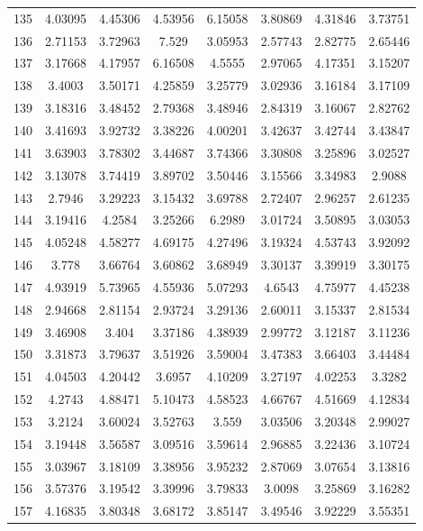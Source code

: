 \begin{center}
\begin{longtable}{cccccccc}
135 & 4.03095 & 4.45306 & 4.53956 & 6.15058 & 3.80869 & 4.31846 & 3.73751\\
136 & 2.71153 & 3.72963 & 7.529 & 3.05953 & 2.57743 & 2.82775 & 2.65446\\
137 & 3.17668 & 4.17957 & 6.16508 & 4.5555 & 2.97065 & 4.17351 & 3.15207\\
138 & 3.4003 & 3.50171 & 4.25859 & 3.25779 & 3.02936 & 3.16184 & 3.17109\\
139 & 3.18316 & 3.48452 & 2.79368 & 3.48946 & 2.84319 & 3.16067 & 2.82762\\
140 & 3.41693 & 3.92732 & 3.38226 & 4.00201 & 3.42637 & 3.42744 & 3.43847\\
141 & 3.63903 & 3.78302 & 3.44687 & 3.74366 & 3.30808 & 3.25896 & 3.02527\\
142 & 3.13078 & 3.74419 & 3.89702 & 3.50446 & 3.15566 & 3.34983 & 2.9088\\
143 & 2.7946 & 3.29223 & 3.15432 & 3.69788 & 2.72407 & 2.96257 & 2.61235\\
144 & 3.19416 & 4.2584 & 3.25266 & 6.2989 & 3.01724 & 3.50895 & 3.03053\\
145 & 4.05248 & 4.58277 & 4.69175 & 4.27496 & 3.19324 & 4.53743 & 3.92092\\
146 & 3.778 & 3.66764 & 3.60862 & 3.68949 & 3.30137 & 3.39919 & 3.30175\\
147 & 4.93919 & 5.73965 & 4.55936 & 5.07293 & 4.6543 & 4.75977 & 4.45238\\
148 & 2.94668 & 2.81154 & 2.93724 & 3.29136 & 2.60011 & 3.15337 & 2.81534\\
149 & 3.46908 & 3.404 & 3.37186 & 4.38939 & 2.99772 & 3.12187 & 3.11236\\
150 & 3.31873 & 3.79637 & 3.51926 & 3.59004 & 3.47383 & 3.66403 & 3.44484\\
151 & 4.04503 & 4.20442 & 3.6957 & 4.10209 & 3.27197 & 4.02253 & 3.3282\\
152 & 4.2743 & 4.88471 & 5.10473 & 4.58523 & 4.66767 & 4.51669 & 4.12834\\
153 & 3.2124 & 3.60024 & 3.52763 & 3.559 & 3.03506 & 3.20348 & 2.99027\\
154 & 3.19448 & 3.56587 & 3.09516 & 3.59614 & 2.96885 & 3.22436 & 3.10724\\
155 & 3.03967 & 3.18109 & 3.38956 & 3.95232 & 2.87069 & 3.07654 & 3.13816\\
156 & 3.57376 & 3.19542 & 3.39996 & 3.79833 & 3.0098 & 3.25869 & 3.16282\\
157 & 4.16835 & 3.80348 & 3.68172 & 3.85147 & 3.49546 & 3.92229 & 3.55351\\

\end{longtable}
\end{center}
